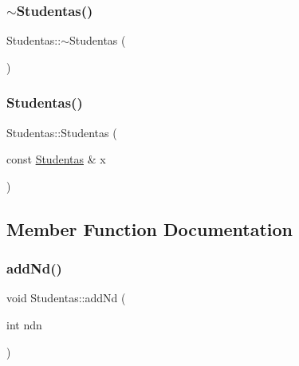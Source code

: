 \subsubsection{\texorpdfstring{$\sim$Studentas()}{~Studentas()}}
{\footnotesize\ttfamily Studentas\+::$\sim$\+Studentas (\begin{DoxyParamCaption}{ }\end{DoxyParamCaption})\hspace{0.3cm}{\ttfamily [inline]}}

\mbox{\label{class_studentas_a9d9605513c1581cb856b1371dd35d89a}} 
\subsubsection{\texorpdfstring{Studentas()}{Studentas()}\hspace{0.1cm}{\footnotesize\ttfamily [3/3]}}
{\footnotesize\ttfamily Studentas\+::\+Studentas (\begin{DoxyParamCaption}\item[{const \mbox{\hyperlink{class_studentas}{Studentas}} \&}]{x }\end{DoxyParamCaption})\hspace{0.3cm}{\ttfamily [inline]}}



\subsection{Member Function Documentation}
\mbox{\label{class_studentas_ab888052467143abd3af75d36c147740a}} 
\subsubsection{\texorpdfstring{addNd()}{addNd()}}
{\footnotesize\ttfamily void Studentas\+::add\+Nd (\begin{DoxyParamCaption}\item[{int}]{ndn }\end{DoxyParamCaption})\hspace{0.3cm}{\ttfamily [inline]}}

\mbox{\label{class_studentas_a2f9dcb2fef2e6b3dbc1581779a90a68a}} 
